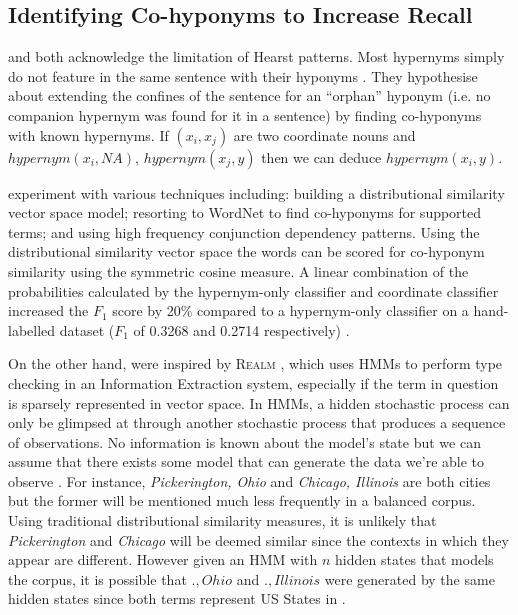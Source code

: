 \subsection{Identifying Co-hyponyms to Increase Recall}
\citep{Snow2004} and \citep{ritter2009anyway} both acknowledge the limitation of Hearst patterns.%
Most hypernyms simply do not feature in the same sentence with their hyponyms \citep{Snow2004, ritter2009anyway}.  They hypothesise about extending the confines of the sentence for an “orphan” hyponym (i.e. no companion hypernym was found for it in a sentence) by finding co-hyponyms with known hypernyms.  If $(x_i, x_j)$ are two coordinate nouns and $hypernym(x_i, NA)$, $hypernym(x_j, y)$ then we can deduce $hypernym(x_i, y)$.

\citeauthor{Snow2004} experiment with various techniques including: building a distributional similarity vector space model; resorting to WordNet to find co-hyponyms for supported terms; and using high frequency conjunction dependency patterns.  Using the distributional similarity vector space the words can be scored for co-hyponym similarity using the symmetric cosine measure.  A linear combination of the probabilities calculated by the hypernym-only classifier and coordinate classifier increased the $F_1$ score by 20\% compared to a hypernym-only classifier on a hand-labelled dataset ($F_1$ of 0.3268 and 0.2714 respectively) \citep{Snow2004}.

On the other hand, \citeauthor{ritter2009anyway} were inspired by \textsc{Realm} \citep{downey2007sparse}, which uses \ac{HMM}s to perform type checking in an Information Extraction system, especially if the term in question is sparsely represented in vector space.  In \ac{HMM}s, a hidden stochastic process can only be glimpsed at through another stochastic process that produces a sequence of observations.  No information is known about the model's state but we can assume that there exists some model that can generate the data we're able to observe \citep{rabiner1989tutorial}.  For instance, \textit{Pickerington, Ohio} and \textit{Chicago, Illinois} are both cities but the former will be mentioned much less frequently in a balanced corpus.  Using traditional distributional similarity measures, it is unlikely that \textit{Pickerington} and \textit{Chicago} will be deemed similar since the contexts in which they appear are different.  However given an \ac{HMM} with $n$ hidden states that models the corpus, it is possible that $., Ohio$ and $., Illinois$ were generated by the same hidden states since both terms represent US States \citep{downey2007sparse} in \citep{ritter2009anyway}.

